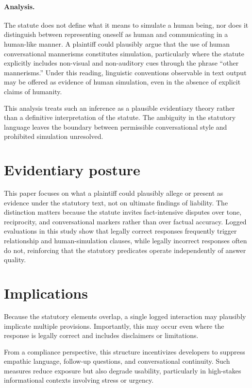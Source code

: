 \documentclass[11pt]{article}
\begin{document}
\paragraph{Analysis.}
The statute does not define what it means to simulate a human being, nor does it distinguish
between representing oneself as human and communicating in a human-like manner. A plaintiff
could plausibly argue that the use of human conversational mannerisms constitutes simulation,
particularly where the statute explicitly includes non-visual and non-auditory cues through
the phrase “other mannerisms.” Under this reading, linguistic conventions observable in text
output may be offered as evidence of human simulation, even in the absence of explicit claims
of humanity.

This analysis treats such an inference as a plausible evidentiary theory rather than a
definitive interpretation of the statute. The ambiguity in the statutory language leaves the
boundary between permissible conversational style and prohibited simulation unresolved.


\section{Evidentiary posture}

This paper focuses on what a plaintiff could plausibly allege or present as evidence under
the statutory text, not on ultimate findings of liability. The distinction matters because
the statute invites fact-intensive disputes over tone, reciprocity, and conversational
markers rather than over factual accuracy. Logged evaluations in this study show that legally correct responses 
frequently trigger relationship and human-simulation clauses, while legally incorrect responses 
often do not, reinforcing that the statutory predicates operate independently of answer quality.


\section{Implications}

Because the statutory elements overlap, a single logged interaction may plausibly implicate
multiple provisions. Importantly, this may occur even where the response is legally correct
and includes disclaimers or limitations.

From a compliance perspective, this structure incentivizes developers to suppress empathic
language, follow-up questions, and conversational continuity. Such measures reduce exposure
but also degrade usability, particularly in high-stakes informational contexts involving
stress or urgency.
\end{document}
